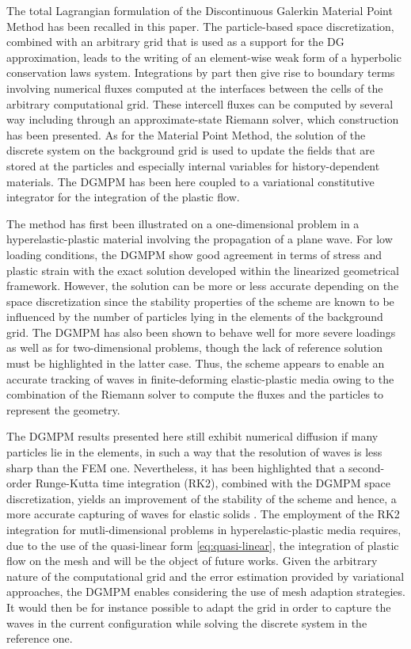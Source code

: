 The total Lagrangian formulation of the Discontinuous Galerkin Material Point Method has been recalled in this paper.
The particle-based space discretization, combined with an arbitrary grid that is used as a support for the DG approximation, leads to the writing of an element-wise weak form of a hyperbolic conservation laws system.
Integrations by part then give rise to boundary terms involving numerical fluxes computed at the interfaces between the cells of the arbitrary computational grid.
These intercell fluxes can be computed by several way including through an approximate-state Riemann solver, which construction has been presented.
As for the Material Point Method, the solution of the discrete system on the background grid is used to update the fields that are stored at the particles and especially internal variables for history-dependent materials.
The DGMPM has been here coupled to a variational constitutive integrator for the integration of the plastic flow.

The method has first been illustrated on a one-dimensional problem in a hyperelastic-plastic material involving the propagation of a plane wave.
For low loading conditions, the DGMPM show good agreement in terms of stress and plastic strain with the exact solution developed within the linearized geometrical framework.
However, the solution can be more or less accurate depending on the space discretization since the stability properties of the scheme are known to be influenced by the number of particles lying in the elements of the background grid.
The DGMPM has also been shown to behave well for more severe loadings as well as for two-dimensional problems, though the lack of reference solution must be highlighted in the latter case.
Thus, the scheme appears to enable an accurate tracking of waves in finite-deforming elastic-plastic media owing to the combination of the Riemann solver to compute the fluxes and the particles to represent the geometry.

The DGMPM results presented here still exhibit numerical diffusion if many particles lie in the elements, in such a way that the resolution of waves is less sharp than the FEM one.
Nevertheless, it has been highlighted that a second-order Runge-Kutta time integration (RK2), combined with the DGMPM space discretization, yields an improvement of the stability of the scheme and hence, a more accurate capturing of waves for elastic solids \cite{DGMPM}.
The employment of the RK2 integration for mutli-dimensional problems in hyperelastic-plastic media requires, due to the use of the quasi-linear form \eqref{eq:quasi-linear}, the integration of plastic flow on the mesh and will be the object of future works.  
Given the arbitrary nature of the computational grid and the error estimation provided by variational approaches, the DGMPM enables considering the use of mesh adaption strategies. 
It would then be for instance possible to adapt the grid in order to capture the waves in the current configuration while solving the discrete system in the reference one.

